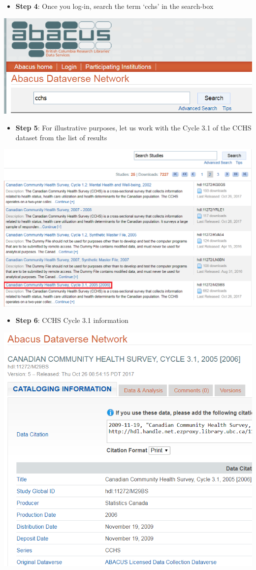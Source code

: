 \documentclass[
]{book}
\providecommand{\tightlist}{%
  \setlength{\itemsep}{0pt}\setlength{\parskip}{0pt}}
\begin{document}
\begin{itemize}
\tightlist
\item
  \textbf{Step 4}: Once you log-in, search the term `cchs' in the search-box
\end{itemize}

\includegraphics[width=0.65\linewidth]{images/abacus4}

\begin{itemize}
\tightlist
\item
  \textbf{Step 5}: For illustrative purposes, let us work with the Cycle 3.1 of the CCHS dataset from the list of results
\end{itemize}

\includegraphics[width=0.65\linewidth]{images/abacus5}

\begin{itemize}
\tightlist
\item
  \textbf{Step 6}: CCHS Cycle 3.1 information
\end{itemize}

\includegraphics[width=0.65\linewidth]{images/abacus6}
\end{document}
